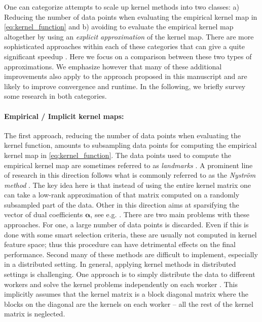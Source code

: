 \documentclass{article} %
\newcommand{\va}{\boldsymbol{\alpha}}
\begin{document}
One can categorize attempts to scale up kernel methods into two classes: a) Reducing the number of data points when evaluating the empirical kernel map in \autoref{eq:kernel_function} and b) avoiding to evaluate the empirical kernel map altogether by using an {\em explicit approximation} of the kernel map. There are more sophisticated approaches within each of these categories that can give a quite significant speedup \cite{Le2013, Rudi2015}. Here we focus on a comparison between these two types of approximations. We emphasize however that many of these additional improvements also apply to the approach proposed in this manuscript and are likely to improve convergence and runtime. In the following, we briefly survey some research in both categories.

\paragraph{Empirical / Implicit kernel maps:} The first approach, reducing the number of data points when evaluating the kernel function, amounts to subsampling data points for computing the empirical kernel map in \autoref{eq:kernel_function}. 
The data points used to compute the empirical kernel map are sometimes referred to as {\em landmarks} \cite{Hsieh2014}. 
A prominent line of research in this direction follows what is commonly referred to as the {\em Nystr\"om method} \cite{Williams2000}. The key idea here is that instead of using the entire kernel matrix one can take a low-rank approximation of that matrix computed on a randomly subsampled part of the data. 
Other in this direction aims at sparsifying the vector of dual coefficients $\va$, see e.g. \cite{WilsonN15, LiangP15}. 
There are two main problems with these approaches. For one, a large number of data points is discarded. Even if this is done with some smart selection criteria, these are usually not computed in kernel feature space; thus this procedure can have detrimental effects on the final performance. Second many of these methods are difficult to implement, especially in a distributed setting. In general, applying kernel methods in distributed settings is challenging. One approach is to simply distribute the data to different workers and solve the kernel problems independently on each worker \cite{Deisenroth2015}. This implicitly assumes that the kernel matrix is a block diagonal matrix where the blocks on the diagonal are the kernels on each worker -- all the rest of the kernel matrix is neglected.
\end{document}
